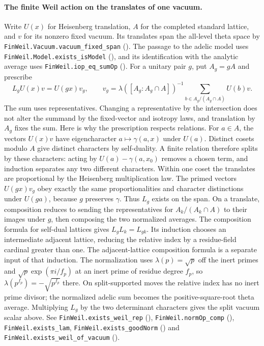 \paragraph{The finite Weil action on the translates of one vacuum.}\label{r14:weil-action}
Write $U(x)$ for Heisenberg translation, $A$ for the completed standard
lattice, and $v$ for its nonzero fixed vacuum. Its translates span the
all-level theta space by \nolinkurl{FinWeil.Vacuum.vacuum_fixed_span}
(). The passage
to the adelic model uses \nolinkurl{FinWeil.Model.exists_isModel}
(), and its
identification with the analytic average uses \nolinkurl{FinWeil.iop_eq_sumOp}
().
For a unitary pair $g$, put $A_g=gA$ and prescribe
\[
  L_g U(x)v=U(gx)v_g,\qquad
  v_g=\lambda([A_g:A_g\cap A])^{-1}
               \sum_{b\in A_g/(A_g\cap A)}U(b)v .
\]
The sum uses representatives. Changing a representative by the intersection
does not alter the summand by the fixed-vector and isotropy laws, and
translation by $A_g$ fixes the sum. Here is why the prescription respects
relations. For $a\in A$, the vectors $U(x)v$ have eigencharacter
$a\mapsto\gamma(a,x)$ under $U(a)$. Distinct cosets modulo $A$ give
distinct characters by self-duality. A finite relation therefore splits
by these characters: acting by $U(a)-\gamma(a,x_0)$ removes a chosen
term, and induction separates any two different characters. Within one
coset the translates are proportional by the Heisenberg multiplication
law. The primed vectors $U(gx)v_g$ obey exactly the same proportionalities
and character distinctions under $U(ga)$, because $g$ preserves
$\gamma$. Thus $L_g$ exists on the span. On a translate, composition
reduces to sending the representatives for $A_k/(A_k\cap A)$ to their
images under $g$, then composing the two normalized averages. The
composition formula for self-dual lattices gives $L_g L_k=L_{gk}$.
Its induction chooses an intermediate adjacent lattice, reducing the
relative index by a residue-field cardinal greater than one. The
adjacent-lattice composition formula is a separate input of that
induction. The normalization uses $\lambda(p)=\sqrt p$ off the
inert primes and $\sqrt p\exp(\pi i/f_p)$ at an inert prime of residue
degree $f_p$, so $\lambda(p^{f_p})=-\sqrt{p^{f_p}}$ there. On split-supported
moves the relative index has no inert prime divisor; the normalized
adelic sum becomes the positive-square-root theta average. Multiplying
$L_g$ by the two determinant characters gives the split vacuum scalar
above. See \nolinkurl{FinWeil.exists_weil_rep}
(),
\nolinkurl{FinWeil.normOp_comp}
(),
\nolinkurl{FinWeil.exists_lam}, \nolinkurl{FinWeil.exists_goodNorm}
() and
\nolinkurl{FinWeil.exists_weil_of_vacuum} ().

